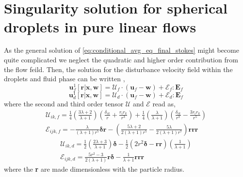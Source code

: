 
\section{Singularity solution for spherical droplets in pure linear flows}
\label{ap:solution_singularity}

As the general solution of \ref{eq:conditional_avg_eq_final_stokes} might become quite complicated we neglect the quadratic and higher order contribution from the flow feild. 
Then, the solution for the disturbance velocity field within the droplets and fluid phase can be written \citep{leal2007advanced}, 
\begin{equation}
    \textbf{u}_f^1[\textbf{r}|\textbf{x},\textbf{w}]
    = 
    \mathcal{U}_f\cdot (\textbf{u}_f - \textbf{w})
    + \mathcal{E}_f: \textbf{E}_{f}
\end{equation}
\begin{equation}
    \textbf{u}_d^1[\textbf{r}|\textbf{x},\textbf{w}]
    = 
    \mathcal{U}_d\cdot (\textbf{u}_f - \textbf{w})
    + \mathcal{E}_d: \textbf{E}_{f}
\end{equation}
where the second and third order tensor $\mathcal{U}$ and $\mathcal{E}$ read as, 
\begin{align}
    \mathcal{U}_{ik,f} = 
    \frac{1}{4}\left(\frac{3\lambda + 2}{\lambda +1}\right)
    \left(\frac{\delta_{ik}}{r} + \frac{r_ir_k}{r^3}\right) 
    + 
    \frac{1}{4}\left(\frac{\lambda}{\lambda +1}\right)
    \left(\frac{\delta_{ik}}{r^3} - \frac{3r_ir_k}{r^5}\right)  \\
    \mathcal{E}_{ijk,f}
    =
    -\frac{\lambda}{(\lambda + 1)r^5} \bm\delta\textbf{r}
    -\left(\frac{5\lambda +2}{2(\lambda +1 )r^5} - \frac{5\lambda}{2(\lambda+1)r^7}\right) \textbf{rrr}
\end{align}
\begin{align}
    \mathcal{U}_{ik,d} = 
    \frac{1}{2}\left(\frac{2\lambda +3}{\lambda +1}\right)\bm\delta
    -\frac{1}{2} (2r^2 \bm\delta - \textbf{rr})
    \left(\frac{1}{\lambda +1}\right)\\
    \mathcal{E}_{ijk,d}
    =
    \frac{5r^2 -3}{2(\lambda +1)} \textbf{r}\bm\delta
    - \frac{1}{\lambda+1}\textbf{rrr}
\end{align}
where the \textbf{r} are made dimensionless with the particle radius. 


